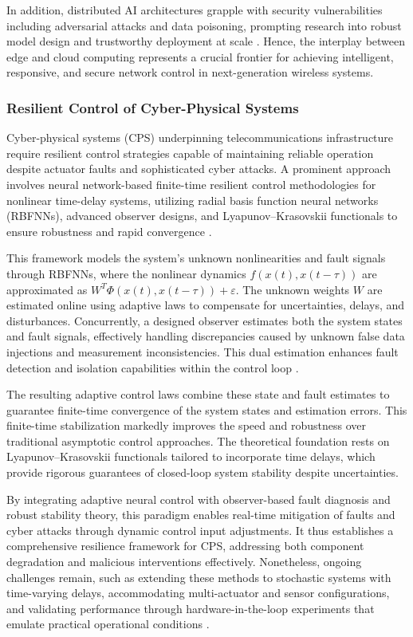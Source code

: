 \documentclass[sigconf]{acmart}
\begin{document}
In addition, distributed AI architectures grapple with security vulnerabilities including adversarial attacks and data poisoning, prompting research into robust model design and trustworthy deployment at scale \cite{ref49,ref50}. Hence, the interplay between edge and cloud computing represents a crucial frontier for achieving intelligent, responsive, and secure network control in next-generation wireless systems.

\subsubsection{Resilient Control of Cyber-Physical Systems}

Cyber-physical systems (CPS) underpinning telecommunications infrastructure require resilient control strategies capable of maintaining reliable operation despite actuator faults and sophisticated cyber attacks. A prominent approach involves neural network-based finite-time resilient control methodologies for nonlinear time-delay systems, utilizing radial basis function neural networks (RBFNNs), advanced observer designs, and Lyapunov--Krasovskii functionals to ensure robustness and rapid convergence \cite{ref46}.

This framework models the system’s unknown nonlinearities and fault signals through RBFNNs, where the nonlinear dynamics \( f(x(t), x(t-\tau)) \) are approximated as \( W^{T} \Phi(x(t), x(t-\tau)) + \varepsilon \). The unknown weights \( W \) are estimated online using adaptive laws to compensate for uncertainties, delays, and disturbances. Concurrently, a designed observer estimates both the system states and fault signals, effectively handling discrepancies caused by unknown false data injections and measurement inconsistencies. This dual estimation enhances fault detection and isolation capabilities within the control loop \cite{ref46}. 

The resulting adaptive control laws combine these state and fault estimates to guarantee finite-time convergence of the system states and estimation errors. This finite-time stabilization markedly improves the speed and robustness over traditional asymptotic control approaches. The theoretical foundation rests on Lyapunov--Krasovskii functionals tailored to incorporate time delays, which provide rigorous guarantees of closed-loop system stability despite uncertainties.

By integrating adaptive neural control with observer-based fault diagnosis and robust stability theory, this paradigm enables real-time mitigation of faults and cyber attacks through dynamic control input adjustments. It thus establishes a comprehensive resilience framework for CPS, addressing both component degradation and malicious interventions effectively. Nonetheless, ongoing challenges remain, such as extending these methods to stochastic systems with time-varying delays, accommodating multi-actuator and sensor configurations, and validating performance through hardware-in-the-loop experiments that emulate practical operational conditions \cite{ref46}.
\end{document}
